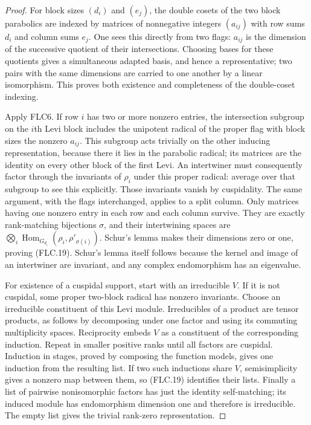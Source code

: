 \begin{proof}
For block sizes $(d_i)$ and $(e_j)$, the double cosets of the
two block parabolics are indexed by matrices of nonnegative
integers $(a_{ij})$ with row sums $d_i$ and column sums $e_j$.
One sees this directly from two flags: $a_{ij}$ is the dimension
of the successive quotient of their intersections.
Choosing bases for these quotients gives a simultaneous
adapted basis, and hence a representative; two pairs with
the same dimensions are carried to one another by a linear
isomorphism.  This proves both existence and completeness of
the double-coset indexing.

Apply FLC6.  If row $i$ has two or more nonzero entries, the
intersection subgroup on the $i$th Levi block includes the
unipotent radical of the proper flag with block sizes the
nonzero $a_{ij}$.  This subgroup acts trivially on the other
inducing representation, because there it lies in the
parabolic radical; its matrices are the identity on every
other block of the first Levi.  An intertwiner must consequently factor
through the invariants of $\rho_i$ under this proper
radical: average over that subgroup to see this explicitly.
Those invariants vanish by cuspidality.  The same argument,
with the flags interchanged, applies to a split column.
Only matrices having one nonzero entry in each row and each
column survive.  They are exactly rank-matching bijections
$\sigma$, and their intertwining spaces are
$\bigotimes_i\operatorname{Hom}_{G_{d_i}}(\rho_i,\rho'_{\sigma(i)})$.
Schur's lemma makes their dimensions zero or one, proving
(FLC.19).  Schur's lemma itself follows because the kernel
and image of an intertwiner are invariant, and any complex
endomorphism has an eigenvalue.

For existence of a cuspidal support, start with an irreducible
$V$.  If it is not cuspidal, some proper two-block radical
has nonzero invariants.  Choose an irreducible constituent
of this Levi module.  Irreducibles of a product are tensor
products, as follows by decomposing under one factor and
using its commuting multiplicity spaces.  Reciprocity embeds
$V$ as a constituent of the corresponding induction.
Repeat in smaller positive ranks until all factors are
cuspidal.  Induction in stages, proved by composing the
function models, gives one induction from the resulting list.
If two such inductions share $V$, semisimplicity gives a
nonzero map between them, so (FLC.19) identifies their lists.
Finally a list of pairwise nonisomorphic factors has just
the identity self-matching; its induced module has
endomorphism dimension one and therefore is irreducible.
The empty list gives the trivial rank-zero representation.
\end{proof}

